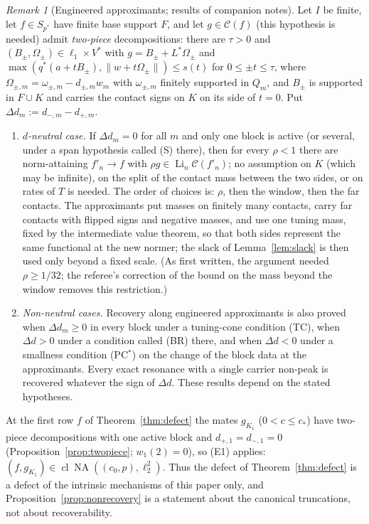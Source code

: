 \documentclass[10pt]{amsart}
\theoremstyle{definition}
\theoremstyle{remark}
\newtheorem{remark}[theorem]{Remark}
\newcommand{\NA}{\operatorname{NA}}
\newcommand{\Cset}{\mathcal C}
\newcommand{\Li}{\operatorname*{Li}}
\newcommand{\cl}{\operatorname{cl}}
\begin{document}
\begin{remark}[Engineered approximants; results of companion notes]
Let $I$ be finite, let $f\in S_{p^*}$ have finite base support $F$, and let
$g\in\Cset(f)$ \textup{(}this hypothesis is needed\textup{)} admit
\emph{two-piece} decompositions: there are $\tau>0$ and
$(B_\pm,\Omega_\pm)\in\ell_1\times V^*$ with $g=B_\pm+L^*\Omega_\pm$ and
$\max(q^*(a+tB_\pm),\|w+t\Omega_\pm\|)\le s(t)$ for $0\le\pm t\le\tau$,
where $\Omega_{\pm,m}=\omega_{\pm,m}-d_{\pm,m}w_m$ with $\omega_{\pm,m}$
finitely supported in $Q_m$, and $B_\pm$ is supported in $F\cup K$ and
carries the contact signs on $K$ on its side of $t=0$.  Put
$\Delta d_m:=d_{-,m}-d_{+,m}$.
\begin{enumerate}
\item[(E1)] \emph{$d$-neutral case.}  If $\Delta d_m=0$ for all $m$ and
only one block is active \textup{(}or several, under a span hypothesis
called \textup{(S)} there\textup{)}, then for every $\rho<1$ there are
norm-attaining $f'_n\to f$ with $\rho g\in\Li_n\Cset(f'_n)$; no assumption
on $K$ \textup{(}which may be infinite\textup{)}, on the split of the
contact mass between the two sides, or on rates of $T$ is needed.  The
order of choices is: $\rho$, then the window, then the far contacts.  The
approximants put masses on finitely many contacts, carry far contacts with
flipped signs and negative masses, and use one tuning mass, fixed by the
intermediate value theorem, so that both sides represent the same
functional at the new normer; the slack of Lemma~\ref{lem:slack} is then
used only beyond a fixed scale.  (As first written, the argument needed
$\rho\ge1/32$; the referee's correction of the bound on the mass beyond
the window removes this restriction.)
\item[(E2)] \emph{Non-neutral cases.}  Recovery along engineered
approximants is also proved when $\Delta d_m\ge0$ in every block under a
tuning-cone condition \textup{(TC)}, when $\Delta d>0$ under a condition
called \textup{(BR)} there, and when $\Delta d<0$ under a smallness
condition \textup{(PC$^*$)} on the change of the block data at the
approximants.  Every exact resonance with a single
carrier non-peak is recovered whatever the sign of $\Delta d$.  These
results depend on the stated hypotheses.
\end{enumerate}
At the first row $f$ of Theorem~\ref{thm:defect} the mates $g_{K_1}$
\textup{(}$0<c\le c_*$\textup{)} have two-piece decompositions with one
active block and $d_{+,1}=d_{-,1}=0$ (Proposition~\ref{prop:twopiece};
$w_1(2)=0$), so (E1) applies: $(f,g_{K_1})\in\cl\NA((c_0,p),\ell_2^2)$.
Thus the defect of Theorem~\ref{thm:defect} is a defect of the intrinsic
mechanisms of this paper only, and Proposition~\ref{prop:nonrecovery} is a
statement about the canonical truncations, not about recoverability.
\end{remark}
\end{document}
